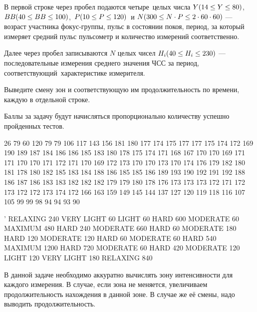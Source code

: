 
В первой строке через пробел подаются четыре целых числа $Y\space(14\leq Y\leq 80)$, $BB\space(40\leq BB\leq 100)$, $P\space(10\leq P\leq 120)$ и $N\space(300\leq N\cdot P\leq 2\cdot 60\cdot 60)$ — возраст участника фокус-группы, пульс в состоянии покоя, период, за который измеряет средний пульс пульсометр и количество измерений соответственно.

Далее через пробел записываются $N$ целых чисел $H_i\space(40\leq H_i\leq 230)$ — последовательные измерения среднего значения ЧСС за период, соответствующий характеристике измерителя.

\outputfmtSection

Выведите смену зон и соответствующую им продолжительность по времени, каждую в отдельной строке. 

\markSection

Баллы за задачу будут начисляться пропорционально количеству успешно пройденных тестов.


\begin{myverbbox}[\small]{\vinput}
    26 79 60 120
    79 79 106 117 143 156 181 180 177 174 175 177 177 175 174 172 169 190 
    189 187 184 186 186 185 183 180 178 175 174 171 168 167 170 170 169 
    171 171 170 170 171 172 171 170 169 172 173 170 170 173 170 174 176 
    179 182 180 181 178 180 182 185 183 184 188 186 185 185 186 189 193 
    190 192 191 192 188 186 187 186 183 183 182 182 182 179 179 180 178 
    176 173 173 173 172 171 172 173 172 172 173 174 172 166 163 159 149 
    145 144 137 127 120 119 118 116 107 105 99 99 98 94 94 93 90
\end{myverbbox}
\begin{myverbbox}[\small]{\voutput}’
    RELAXING 240
    VERY LIGHT 60
    LIGHT 60
    HARD 600
    MODERATE 60
    MAXIMUM 480
    HARD 240
    MODERATE 660
    HARD 60
    MODERATE 180
    HARD 120
    MODERATE 120
    HARD 60
    MODERATE 60
    HARD 540
    MAXIMUM 1200
    HARD 720
    MODERATE 60
    HARD 420
    MODERATE 120
    LIGHT 120
    VERY LIGHT 180
    RELAXING 840
\end{myverbbox}

\solutionSection

В данной задаче необходимо аккуратно вычислять зону интенсивности для каждого измерения. В случае, если зона не меняется, увеличиваем продолжительность нахождения в данной зоне. В случае же её смены, надо выводить продолжительность.
